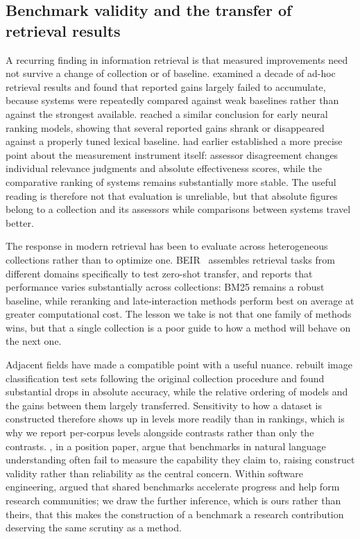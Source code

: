 \documentclass[smallextended,natbib]{svjour3}
\begin{document}
\subsection{Benchmark validity and the transfer of retrieval results}
\label{sec:related-benchmarks}

A recurring finding in information retrieval is that measured improvements need not survive a change of collection or of baseline.
\citet{Armstrong2009} examined a decade of ad-hoc retrieval results and found that reported gains largely failed to accumulate, because systems were repeatedly compared against weak baselines rather than against the strongest available.
\citet{Yang2019} reached a similar conclusion for early neural ranking models, showing that several reported gains shrank or disappeared against a properly tuned lexical baseline.
\citet{Voorhees2000} had earlier established a more precise point about the measurement instrument itself: assessor disagreement changes individual relevance judgments and absolute effectiveness scores, while the comparative ranking of systems remains substantially more stable.
The useful reading is therefore not that evaluation is unreliable, but that absolute figures belong to a collection and its assessors while comparisons between systems travel better.

The response in modern retrieval has been to evaluate across heterogeneous collections rather than to optimize one.
BEIR~\citep{Thakur2021} assembles retrieval tasks from different domains specifically to test zero-shot transfer, and reports that performance varies substantially across collections: BM25 remains a robust baseline, while reranking and late-interaction methods perform best on average at greater computational cost.
The lesson we take is not that one family of methods wins, but that a single collection is a poor guide to how a method will behave on the next one.

Adjacent fields have made a compatible point with a useful nuance.
\citet{Recht2019} rebuilt image classification test sets following the original collection procedure and found substantial drops in absolute accuracy, while the relative ordering of models and the gains between them largely transferred.
Sensitivity to how a dataset is constructed therefore shows up in levels more readily than in rankings, which is why we report per-corpus levels alongside contrasts rather than only the contrasts.
\citet{BowmanDahl2021}, in a position paper, argue that benchmarks in natural language understanding often fail to measure the capability they claim to, raising construct validity rather than reliability as the central concern.
Within software engineering, \citet{Sim2003} argued that shared benchmarks accelerate progress and help form research communities; we draw the further inference, which is ours rather than theirs, that this makes the construction of a benchmark a research contribution deserving the same scrutiny as a method.
\end{document}
